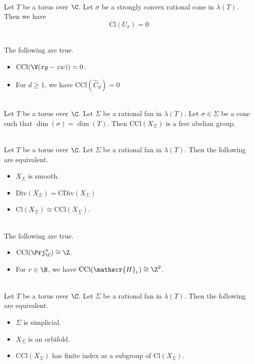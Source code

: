 \documentclass[a4paper]{article}
\begin{document}
\begin{prp}{}{}\\
Let $T$ be a torus over $\C$. Let $\sigma$ be a strongly convex rational cone in $\lambda(T)$. Then we have $$\text{Cl}(U_\sigma)=0$$
\end{prp}

\begin{eg}{}{}\\
The following are true. 
\begin{itemize}
\item $\text{CCl}(\V(xy-zw))=0$. 
\item For $d\geq 1$, we have $\text{CCl}(\widehat{C}_d)=0$
\end{itemize}
\end{eg}

\begin{prp}{}{}\\
Let $T$ be a torus over $\C$. Let $\Sigma$ be a rational fan in $\lambda(T)$. Let $\sigma\in\Sigma$ be a cone such that $\dim(\sigma)=\dim(T)$. Then $\text{CCl}(X_\Sigma)$ is a free abelian group. 
\end{prp}

\begin{prp}{}{}\\
Let $T$ be a torus over $\C$. Let $\Sigma$ be a rational fan in $\lambda(T)$.  Then the following are equivalent. 
\begin{itemize}
\item $X_\Sigma$ is smooth. 
\item $\text{Div}(X_\Sigma)=\text{CDiv}(X_\Sigma)$
\item $\text{Cl}(X_\Sigma)\cong\text{CCl}(X_\Sigma)$. 
\end{itemize}
\end{prp}

\begin{eg}{}{}\\
The following are true. 
\begin{itemize}
\item $\text{CCl}(\Prj_\C^n)\cong\Z$. 
\item For $r\in\N$, we have $\text{CCl}(\mathscr{H}_r)\cong\Z^2$. 
\end{itemize}
\end{eg}

\begin{prp}{}{}\\
Let $T$ be a torus over $\C$. Let $\Sigma$ be a rational fan in $\lambda(T)$. Then the following are equivalent. 
\begin{itemize}
\item $\Sigma$ is simplicial. 
\item $X_\Sigma$ is an orbifold. 
\item $\text{CCl}(X_\Sigma)$ has finite index as a subgroup of $\text{Cl}(X_\Sigma)$. 
\end{itemize}
\end{prp}
\end{document}
